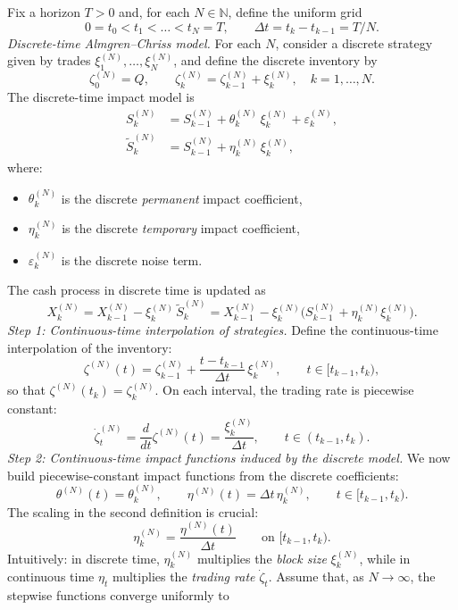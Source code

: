 \documentclass[final,3p,authoryear,12pt]{elsarticle}
\begin{document}
Fix a horizon $T>0$ and, for each $N\in\mathbb{N}$, define the uniform grid
\[
0 = t_0 < t_1 < \dots < t_N = T,
\qquad
\Delta t = t_k - t_{k-1} = T/N.
\]
\medskip\noindent
\textit{Discrete-time Almgren--Chriss model.}
For each $N$, consider a discrete strategy given by trades
$\xi^{(N)}_1,\dots,\xi^{(N)}_N$, and define the discrete inventory by
\[
\zeta^{(N)}_0 = Q, 
\qquad 
\zeta^{(N)}_k = \zeta^{(N)}_{k-1} + \xi^{(N)}_k,\quad k=1,\dots,N.
\]
The discrete-time impact model is
\begin{align}
S^{(N)}_k 
&= S^{(N)}_{k-1} + \theta^{(N)}_k\,\xi^{(N)}_k + \varepsilon^{(N)}_k,
\label{eq:disc-price}\\
\tilde S^{(N)}_k 
&= S^{(N)}_{k-1} + \eta^{(N)}_k\,\xi^{(N)}_k,
\label{eq:disc-exec}
\end{align}
where:
\begin{itemize}
  \item $\theta^{(N)}_k$ is the discrete \emph{permanent} impact coefficient,
  \item $\eta^{(N)}_k$ is the discrete \emph{temporary} impact coefficient,
  \item $\varepsilon^{(N)}_k$ is the discrete noise term.
\end{itemize}
The cash process in discrete time is updated as
\[
X^{(N)}_k 
= X^{(N)}_{k-1} - \xi^{(N)}_k\,\tilde S^{(N)}_k
= X^{(N)}_{k-1} - \xi^{(N)}_k\Big(S^{(N)}_{k-1} + \eta^{(N)}_k\xi^{(N)}_k\Big).
\]
\medskip\noindent
\textit{Step 1: Continuous-time interpolation of strategies.}
Define the continuous-time interpolation of the inventory:
\[
\zeta^{(N)}(t)
= \zeta^{(N)}_{k-1} 
   + \frac{t - t_{k-1}}{\Delta t}\,\xi^{(N)}_k,
\qquad t\in[t_{k-1},t_k),
\]
so that $\zeta^{(N)}(t_k)=\zeta^{(N)}_k$. On each interval, the trading rate is
piecewise constant:
\[
\dot\zeta^{(N)}_t
= \frac{d}{dt}\zeta^{(N)}(t)
= \frac{\xi^{(N)}_k}{\Delta t},
\qquad t\in(t_{k-1},t_k).
\]
\medskip\noindent
\textit{Step 2: Continuous-time impact functions induced by the discrete model.}
We now build piecewise-constant impact functions from the discrete
coefficients:
\[
\theta^{(N)}(t) = \theta^{(N)}_k,
\qquad
\eta^{(N)}(t) = \Delta t\,\eta^{(N)}_k,
\qquad
t\in[t_{k-1},t_k).
\]
The scaling in the second definition is crucial:
\[
\eta^{(N)}_k = \frac{\eta^{(N)}(t)}{\Delta t}
\qquad
\text{on }[t_{k-1},t_k).
\]
Intuitively: in discrete time, $\eta^{(N)}_k$ multiplies the \emph{block
size} $\xi^{(N)}_k$, while in continuous time $\eta_t$ multiplies the
\emph{trading rate} $\dot\zeta_t$.
Assume that, as $N\to\infty$, the stepwise functions converge uniformly to
\end{document}
